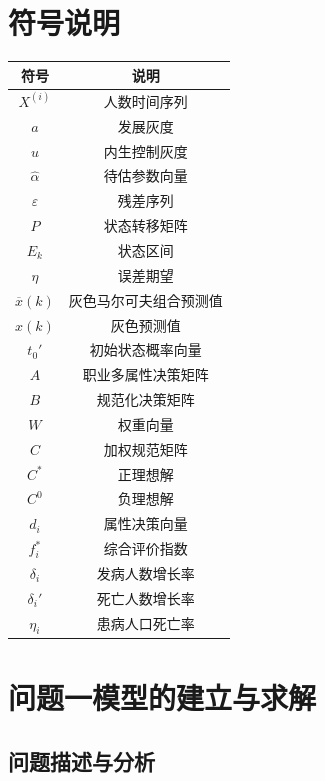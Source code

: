 \documentclass{whutmod}
\begin{document}
	
	\section{符号说明}
	\begin{table}[H]
	\label{biao} \centering

	\begin{tabular}{cc}
		\toprule[1.5pt]
		\multicolumn{1}{m{5cm}}{\centering 符号} & \multicolumn{1}{m{5cm}}{\centering 说明} \\
		\midrule[1pt]		
		$X^{(i)}$  & 人数时间序列  \\ 
		$a$  &  发展灰度 \\ 
		$u$  &  内生控制灰度\\
		$\widehat{\alpha}$  &  待估参数向量 \\ 
		$\varepsilon$ & 残差序列\\
		$P$	 &  状态转移矩阵  \\ 
		$E_{k}$ &  状态区间 \\ 
		$\eta $  &   误差期望\\ 
		$\overline{x}(k)$  &  灰色马尔可夫组合预测值\\	
		$\widehat{x}(k)$ & 灰色预测值\\
		$t_{0}'$ &  初始状态概率向量\\ 
		$A$ & 职业多属性决策矩阵\\
		$B$ & 规范化决策矩阵\\
		$W$ & 权重向量\\
		$C$  & 加权规范矩阵\\
		$C^{*}$ & 正理想解\\
		$C^{0}$ & 负理想解\\
		$d_{i}$ & 属性决策向量\\
		$ f_{i}^{*}$ &  综合评价指数\\
		$ \delta_{i}$ &发病人数增长率 \\
		$ \delta_{i}'$ &死亡人数增长率 \\
		$ \eta_{i}$    &患病人口死亡率 \\
		\bottomrule[1.5pt]
	\end{tabular}
\end{table}

	\section{问题一模型的建立与求解}
    \subsection{问题描述与分析}
\end{document}
